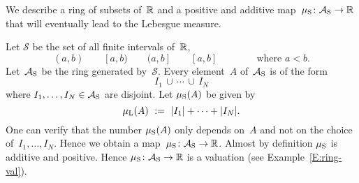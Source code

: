 \documentclass[main.tex]{subfiles}
\begin{document}
%
%
\begin{ex}
\label{E:smeas-val}
We describe a ring of subsets of~$\mathbb{R}$
and a positive and additive 
map~$\mu_{\mathrm{S}}\colon \mathcal{A}_{\mathrm{S}}\rightarrow \mathbb{R}$ that 
will eventually
lead to the Lebesgue measure.

Let $\mathcal{S}$ be the set of all finite intervals of~$\mathbb{R}$,
\begin{equation*}
(a,b)\qquad [a,b)\qquad (a,b]\qquad [a,b]
\qquad\qquad\text{where }a<b.
\end{equation*}
Let~$\mathcal{A}_{\mathrm{S}}$ be the ring generated by~$\mathcal{S}$.
Every element~$A$ of~$\mathcal{A}_{\mathrm{S}}$ is of the form
\begin{equation*}
I_1 \,\cup \,\dotsb \,\cup\, I_N
\end{equation*}
where $I_1,\dotsc,I_N\in \mathcal{A}_{\mathrm{S}}$
are disjoint.
Let $\mu_{\mathrm{S}}(A)$ be given by
\begin{equation*}
\mu_{\mathrm L}(A) \ :=\  |I_1| + \dotsb + |I_N|.
\end{equation*}
One can verify that the number $\mu_{\mathrm{S}}(A)$
only depends on~$A$ and not on the choice of~$I_1,\dotsc,I_N$.
Hence we obtain a map~$\mu_{\mathrm{S}}\colon \mathcal{A}_{\mathrm{S}} \rightarrow \mathbb{R}$.
Almost by definition $\mu_{\mathrm{S}}$ is additive and positive.
Hence $\mu_{\mathrm{S}}\colon\mathcal{A}_{\mathrm{S}}\rightarrow \mathbb{R}$ is a valuation 
(see Example~\ref{E:ring-val}).
\end{ex}
\end{document}
